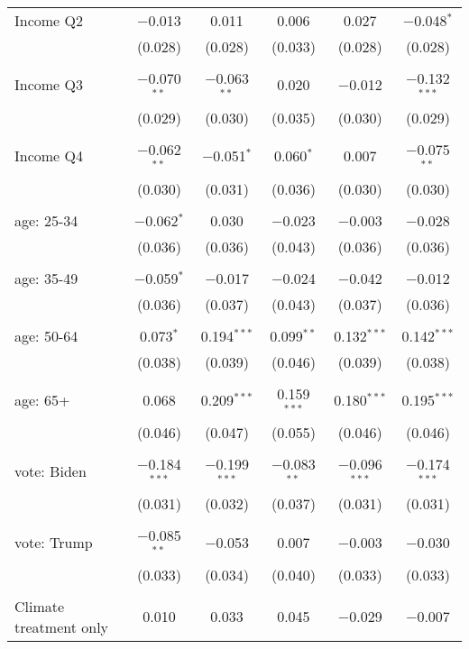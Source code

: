 \begin{tabular}{@{\extracolsep{5pt}}lccccc}
 Income Q2 & $-$0.013 & 0.011 & 0.006 & 0.027 & $-$0.048$^{*}$ \\ 
  & (0.028) & (0.028) & (0.033) & (0.028) & (0.028) \\ 
  & & & & & \\ 
 Income Q3 & $-$0.070$^{**}$ & $-$0.063$^{**}$ & 0.020 & $-$0.012 & $-$0.132$^{***}$ \\ 
  & (0.029) & (0.030) & (0.035) & (0.030) & (0.029) \\ 
  & & & & & \\ 
 Income Q4 & $-$0.062$^{**}$ & $-$0.051$^{*}$ & 0.060$^{*}$ & 0.007 & $-$0.075$^{**}$ \\ 
  & (0.030) & (0.031) & (0.036) & (0.030) & (0.030) \\ 
  & & & & & \\ 
 age: 25-34 & $-$0.062$^{*}$ & 0.030 & $-$0.023 & $-$0.003 & $-$0.028 \\ 
  & (0.036) & (0.036) & (0.043) & (0.036) & (0.036) \\ 
  & & & & & \\ 
 age: 35-49 & $-$0.059$^{*}$ & $-$0.017 & $-$0.024 & $-$0.042 & $-$0.012 \\ 
  & (0.036) & (0.037) & (0.043) & (0.037) & (0.036) \\ 
  & & & & & \\ 
 age: 50-64 & 0.073$^{*}$ & 0.194$^{***}$ & 0.099$^{**}$ & 0.132$^{***}$ & 0.142$^{***}$ \\ 
  & (0.038) & (0.039) & (0.046) & (0.039) & (0.038) \\ 
  & & & & & \\ 
 age: 65+ & 0.068 & 0.209$^{***}$ & 0.159$^{***}$ & 0.180$^{***}$ & 0.195$^{***}$ \\ 
  & (0.046) & (0.047) & (0.055) & (0.046) & (0.046) \\ 
  & & & & & \\ 
 vote: Biden & $-$0.184$^{***}$ & $-$0.199$^{***}$ & $-$0.083$^{**}$ & $-$0.096$^{***}$ & $-$0.174$^{***}$ \\ 
  & (0.031) & (0.032) & (0.037) & (0.031) & (0.031) \\ 
  & & & & & \\ 
 vote: Trump & $-$0.085$^{**}$ & $-$0.053 & 0.007 & $-$0.003 & $-$0.030 \\ 
  & (0.033) & (0.034) & (0.040) & (0.033) & (0.033) \\ 
  & & & & & \\ 
 Climate treatment only & 0.010 & 0.033 & 0.045 & $-$0.029 & $-$0.007 \\ 

\end{tabular}
